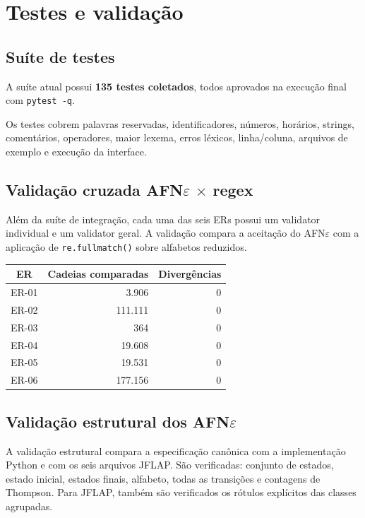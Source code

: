 \chapter{Testes e validação}

\section{Suíte de testes}

A suíte atual possui \textbf{135 testes coletados}, todos aprovados na execução final com \texttt{pytest -q}.

Os testes cobrem palavras reservadas, identificadores, números, horários, strings, comentários, operadores, maior lexema, erros léxicos, linha/coluna, arquivos de exemplo e execução da interface.

\section{\texorpdfstring{Validação cruzada AFN$\varepsilon$ $\times$ regex}{Validação cruzada AFN epsilon x regex}}

Além da suíte de integração, cada uma das seis ERs possui um validator individual e um validator geral. A validação compara a aceitação do AFN$\varepsilon$ com a aplicação de \texttt{re.fullmatch()} sobre alfabetos reduzidos.

\begin{center}
\small
\begin{tabular}{|c|r|r|}
\toprule
ER & Cadeias comparadas & Divergências \\
\midrule
ER-01 & 3.906 & 0 \\
ER-02 & 111.111 & 0 \\
ER-03 & 364 & 0 \\
ER-04 & 19.608 & 0 \\
ER-05 & 19.531 & 0 \\
ER-06 & 177.156 & 0 \\
\bottomrule
\end{tabular}
\end{center}

\section{\texorpdfstring{Validação estrutural dos AFN$\varepsilon$}{Validação estrutural dos AFN epsilon}}

A validação estrutural compara a especificação canônica com a implementação Python e com os seis arquivos JFLAP. São verificadas: conjunto de estados, estado inicial, estados finais, alfabeto, todas as transições e contagens de Thompson. Para JFLAP, também são verificados os rótulos explícitos das classes agrupadas.

